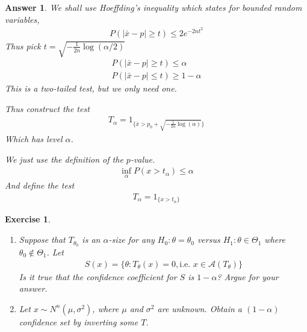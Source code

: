 \documentclass[12pt]{article}
\theoremstyle{colon}
\newtheorem{exercise}{Exercise}
\newtheorem*{answer}{Answer}
\begin{document}
\begin{answer}
  \leavevmode
  \item We shall use Hoeffding's inequality which states for bounded random variables,
    \begin{gather*}
      P( \lvert \bar{x} - p \rvert \geq t) \leq 2 e^{-2 n t^2}
    \end{gather*}
    Thus pick $t = \sqrt{-\frac{1}{2n} \log (\alpha/2)}$
    \begin{gather*}
      P( \lvert \bar{x} - p \rvert \geq t) \leq \alpha \\
      P( \lvert \bar{x} - p \rvert \leq t) \geq 1 - \alpha
    \end{gather*}
    This is a two-tailed test, but we only need one.

    Thus construct the test
    \begin{gather*}
      T_\alpha = 1_{ \{ \bar{x} > p_0 + \sqrt{-\frac{1}{2n} \log (\alpha)} \} }
    \end{gather*}
    Which has level $\alpha$.
  \item We just use the definition of the $p$-value.
    \begin{gather*}
      \inf_\alpha P(x > t_\alpha) \leq \alpha
    \end{gather*}
    And define the test
    \begin{gather*}
      T_\alpha = 1_{ \{ x > t_\alpha \} }
    \end{gather*}
\end{answer}

\clearpage

\begin{exercise}
  \leavevmode
  \begin{enumerate}[label=\arabic*)]
    \item Suppose that $T_{\theta_0}$ is an $\alpha$-size for any $H_0 : \theta = \theta_0$ versus $H_1 : \theta \in \Theta_1$ where $\theta_0 \notin \Theta_1$. Let
      \begin{gather*}
        S(x) = \{ \theta : T_\theta(x) = 0, \text{i.e. } x \in \mathcal{A}(T_\theta) \}
      \end{gather*}
      Is it true that the confidence coefficient for $S$ is $1-\alpha$? Argue for your answer.
    \item Let $x \sim N^n(\mu, \sigma^2)$, where $\mu$ and $\sigma^2$ are unknown. Obtain a $(1-\alpha)$ confidence set by inverting some $T$.
  \end{enumerate}
\end{exercise}
\end{document}
